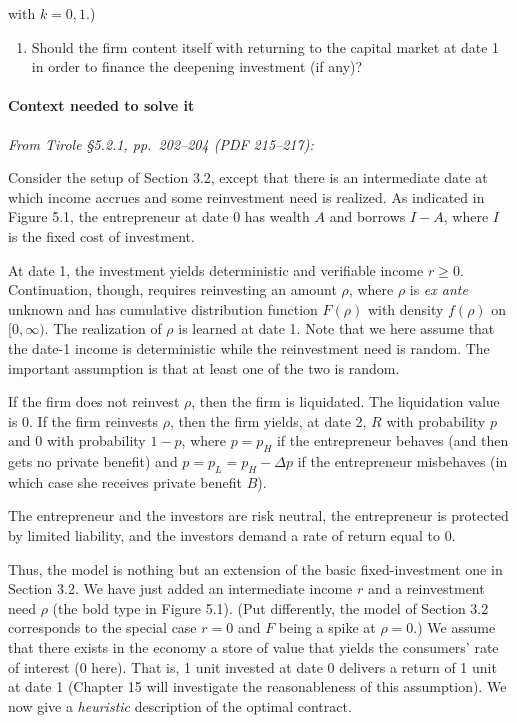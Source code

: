 \documentclass[11pt,a4paper]{article}
\providecommand{\tightlist}{\setlength{\itemsep}{0pt}\setlength{\parskip}{0pt}}
\begin{document}
with \(k = 0, 1\).)

\begin{enumerate}
\def\labelenumi{(\roman{enumi})}
\setcounter{enumi}{3}
\tightlist
\item
  Should the firm content itself with returning to the capital market at date 1 in order to finance
  the deepening investment (if any)?
\end{enumerate}

\paragraph{Context needed to solve it}

\emph{From Tirole §5.2.1, pp.~202--204 (PDF 215--217):}

Consider the setup of Section 3.2, except that there is an intermediate date at which income accrues
and some reinvestment need is realized. As indicated in Figure 5.1, the entrepreneur at date 0 has
wealth \(A\) and borrows \(I - A\), where \(I\) is the fixed cost of investment.

At date 1, the investment yields deterministic and verifiable income \(r \geqslant 0\).
Continuation, though, requires reinvesting an amount \(\rho\), where \(\rho\) is \emph{ex ante}
unknown and has cumulative distribution function \(F(\rho)\) with density \(f(\rho)\) on
\([0, \infty)\). The realization of \(\rho\) is learned at date 1. Note that we here assume that the
date-1 income is deterministic while the reinvestment need is random. The important assumption is
that at least one of the two is random.

If the firm does not reinvest \(\rho\), then the firm is liquidated. The liquidation value is 0. If
the firm reinvests \(\rho\), then the firm yields, at date 2, \(R\) with probability \(p\) and 0
with probability \(1 - p\), where \(p = p_H\) if the entrepreneur behaves (and then gets no private
benefit) and \(p = p_L = p_H - \Delta p\) if the entrepreneur misbehaves (in which case she receives
private benefit \(B\)).

The entrepreneur and the investors are risk neutral, the entrepreneur is protected by limited
liability, and the investors demand a rate of return equal to 0.

Thus, the model is nothing but an extension of the basic fixed-investment one in Section 3.2. We
have just added an intermediate income \(r\) and a reinvestment need \(\rho\) (the bold type in
Figure 5.1). (Put differently, the model of Section 3.2 corresponds to the special case \(r = 0\)
and \(F\) being a spike at \(\rho = 0\).) We assume that there exists in the economy a store of
value that yields the consumers' rate of interest (0 here). That is, 1 unit invested at date 0
delivers a return of 1 unit at date 1 (Chapter 15 will investigate the reasonableness of this
assumption). We now give a \emph{heuristic} description of the optimal contract.
\end{document}
